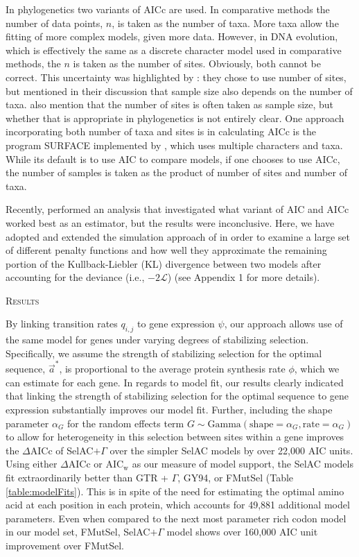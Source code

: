 \documentclass[12pt,letterpaper,fleqn]{article}
\renewcommand{\section}[1]{%
\bigskip
\begin{center}
\begin{Large}
\normalfont\scshape #1
\medskip
\end{Large}
\end{center}}
\newcommand{\DeltaAICc}{\ensuremath{\Delta\text{AICc}}\xspace}
\newcommand{\AICw}{\ensuremath{\text{AIC}_\text{w}}\xspace}
\newcommand{\Lik}{\ensuremath{\mathcal{L}}\xspace}%
\newcommand{\selac}{SelAC\xspace}
\newcommand{\selacplusgamma}{SelAC$+\Gamma$\xspace}
\newcommand{\alphag}{\ensuremath{\alpha_G}\xspace}
\newcommand{\aoptvec}{\ensuremath{\Vec{a}^*}\xspace}
\newcommand{\qij}{\ensuremath{q_{i,j}}\xspace}
\begin{document}
In phylogenetics two variants of AICc are used.
In comparative methods \citep[e.g.~][]{ButlerKing2004, OMearaetal2006, BeaulieuEtAl2013} the number of data points, $n$, is taken as the number of taxa.
More taxa allow the fitting of more complex models, given more data.
However, in DNA evolution, which is effectively the same as a discrete character model used in comparative methods, the $n$ is taken as the number of sites.
Obviously, both cannot be correct.
This uncertainty was highlighted by \citet{posadaBuckley2004}: they chose to use number of sites, but mentioned in their discussion that sample size also depends on the number of taxa.
\citet{SullivanJoyce2005} also mention that the number of sites is often taken as sample size, but whether that is appropriate in phylogenetics is not entirely clear.
One approach incorporating both number of taxa and sites is in calculating AICc is the program SURFACE implemented by \citet{IngramMahler2013}, which uses multiple characters and taxa.
While its default is to use AIC to compare models, if one chooses to use AICc, the number of samples is taken as the product of number of sites and number of taxa.

Recently, \citet{Jhwuengetal2014} performed an analysis that investigated what variant of AIC and AICc worked best as an estimator, but the results were inconclusive.
Here, we have adopted and extended the simulation approach of \citet{Jhwuengetal2014} in order to examine a large set of different penalty functions and how well they approximate the remaining portion of the Kullback-Liebler (KL) divergence between two models after accounting for the deviance (i.e., $-2\Lik$) (see Appendix 1 for more details).


\section{Results}
By linking transition rates $\qij$ to gene expression $\psi$, our approach allows use of the same model for genes under varying degrees of stabilizing selection.
Specifically, we assume the strength of stabilizing selection for the optimal sequence, \aoptvec, is proportional to the average protein synthesis rate $\phi$, which we can estimate for each gene.
In regards to model fit, our results clearly indicated that linking the strength of stabilizing selection for the optimal sequence to gene expression substantially improves our model fit.
Further, including the shape parameter \alphag for the random effects term $G \sim \text{Gamma}(\text{shape} = \alphag, \text{rate}=\alphag)$ to allow for heterogeneity in this selection between sites within a gene improves the \DeltaAICc of \selacplusgamma over the simpler \selac models by over 22,000 AIC units.
Using either \DeltaAICc or \AICw as our measure of model support, the \selac models fit extraordinarily better than GTR + $\Gamma$, GY94, or FMutSel (Table \ref{table:modelFits}).
This is in spite of the need for estimating the optimal amino acid at each position in each protein, which accounts for 49,881 additional model parameters.
Even when compared to the next most parameter rich codon model in our model set, FMutSel, \selacplusgamma model shows over 160,000 AIC unit improvement over FMutSel.
\end{document}
